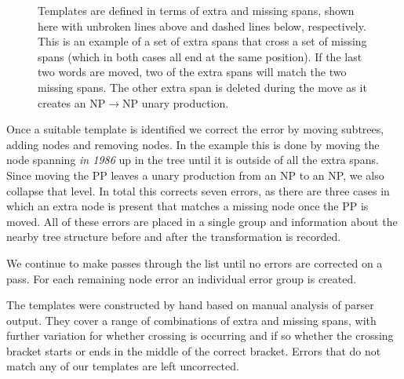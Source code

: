 \begin{figure}
\begin{center}
\end{center}
\caption{
	\label{fig:template}
	Templates are defined in terms of extra and missing spans, shown here with
	unbroken lines above and dashed lines below, respectively.  This is an
	example of a set of extra spans that cross a set of missing spans (which in
	both cases all end at the same position).  If the last two words are moved,
	two of the extra spans will match the two missing spans.  The other extra
	span is deleted during the move as it creates an NP$\rightarrow$NP unary
	production.
}
\end{figure}

Once a suitable template is identified we correct the error by moving subtrees,
adding nodes and removing nodes.  In the example this is done by moving the
node spanning \emph{in 1986} up in the tree until it is outside of all the
extra spans.  Since moving the PP leaves a unary production from an NP to an
NP, we also collapse that level.  In total this corrects seven errors, as there
are three cases in which an extra node is present that matches a missing node
once the PP is moved.  All of these errors are placed in a single group and
information about the nearby tree structure before and after the transformation
is recorded.

We continue to make passes through the list until no errors are corrected on a
pass.  For each remaining node error an individual error group is created.

The templates were constructed by hand based on manual analysis of parser
output.  They cover a range of combinations of extra and missing spans, with
further variation for whether crossing is occurring and if so whether the
crossing bracket starts or ends in the middle of the correct bracket.
Errors that do not match any of our templates are left uncorrected.

